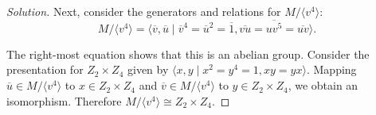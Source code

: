 \documentclass{article}
\begin{document}
\begin{proof}[Solution]
    Next, consider the generators and relations for $M/\langle v^4 \rangle$:
    \begin{equation*}
        M/\langle v^4 \rangle = \langle \overline{v}, \overline{u} \mid \overline{v}^4 = \overline{u}^2 = \overline{1}, \overline{v u} = \overline{u v^5} = \overline{uv} \rangle.
    \end{equation*}

    The right-most equation shows that this is an abelian group. Consider the presentation for $Z_2 \times Z_4$ given by $\langle x, y \mid x^2 = y^4 = 1, xy = yx \rangle$. Mapping $\overline{u} \in M/\langle v^4 \rangle$ to $x \in Z_2 \times Z_4$ and $\overline{v} \in M/\langle v^4 \rangle$ to $y \in Z_2 \times Z_4$, we obtain an isomorphism. Therefore $M/\langle v^4 \rangle \cong Z_2 \times Z_4$.
\end{proof}
\end{document}

